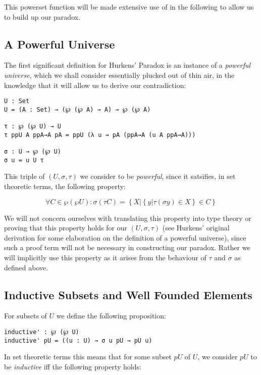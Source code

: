 \documentclass[runningheads]{llncs}
\begin{document}
This powerset function will be made extensive use of in the following to allow
us to build up our paradox.

\subsection{A Powerful Universe}

The first significant definition for Hurkens' Paradox is an instance of a
\textit{powerful universe}, which we shall consider essentially plucked out of
thin air, in the knowledge that it will allow us to derive our contradiction:


\begin{verbatim}
U : Set
U = (A : Set) → (℘ (℘ A) → A) → ℘ (℘ A)

τ : ℘ (℘ U) → U
τ ppU A ppA→A pA = ppU (λ u → pA (ppA→A (u A ppA→A)))

σ : U → ℘ (℘ U)
σ u = u U τ        
\end{verbatim}

This triple of $(U,\sigma,\tau)$ we consider to be \textit{powerful}, since it
satsifies, in set theoretic terms, the following property:

$$
\forall C \in \wp (\wp U): \sigma (\tau C) = \left \{ X | \left \{ y | \tau (\sigma y) \in X \right \} \in C \right \}
$$

We will not concern ourselves with translating this property into type theory or
proving that this property holds for our $(U, \sigma, \tau)$ (see Hurkens'
original derivation \cite{hurkens1995simplification} for some elaboration on the
definition of a powerful universe), since such a proof term will not be
necessary in constructing our paradox. Rather we will implicitly use this
property as it arises from the behaviour of $\tau$ and $\sigma$ as defined
above.

\subsection{Inductive Subsets and Well Founded Elements}

For subsets of $U$ we define the following proposition:

\begin{verbatim}
inductive' : ℘ (℘ U)
inductive' pU = ((u : U) → σ u pU → pU u)
\end{verbatim}


In set theoretic terms this means that for some subset $pU$ of $U$, we consider
$pU$ to be \textit{inductive} iff the following property holds:
\end{document}
